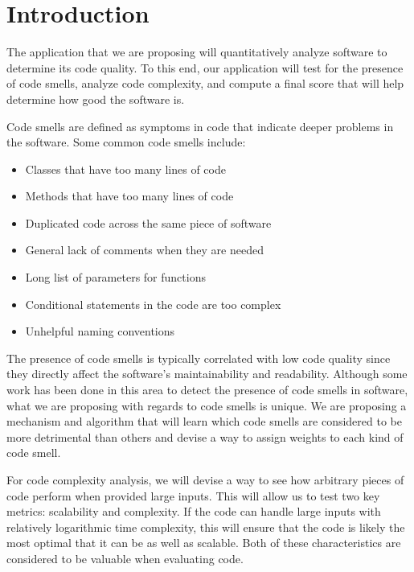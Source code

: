 \documentclass{sig-alternate}
\begin{document}
\section{Introduction}
\label{sec:intro}
The application that we are proposing will quantitatively analyze software to determine its code quality. To this end, our application will test for the presence of code smells, analyze code complexity, and compute a final score that will help determine how good the software is.
 
Code smells are defined as symptoms in code that indicate deeper problems in the software. Some common code smells include:
\begin{itemize}
\item Classes that have too many lines of code
\item Methods that have too many lines of code
\item Duplicated code across the same piece of software
\item General lack of comments when they are needed
\item Long list of parameters for functions
\item Conditional statements in the code are too complex
\item Unhelpful naming conventions
\end{itemize}

The presence of code smells is typically correlated with low code quality since they directly affect the software's maintainability and readability. Although some work has been done in this area to detect the presence of code smells in software, what we are proposing with regards to code smells is unique. We are proposing a mechanism and algorithm that will learn which code smells are considered to be more detrimental than others and devise a way to assign weights to each kind of code smell. 

For code complexity analysis, we will devise a way to see how arbitrary pieces of code perform when provided large inputs. This will allow us to test two key metrics: scalability and complexity. If the code can handle large inputs with relatively logarithmic time complexity, this will ensure that the code is likely the most optimal that it can be as well as scalable. Both of these characteristics are considered to be valuable when evaluating code.
\end{document}

